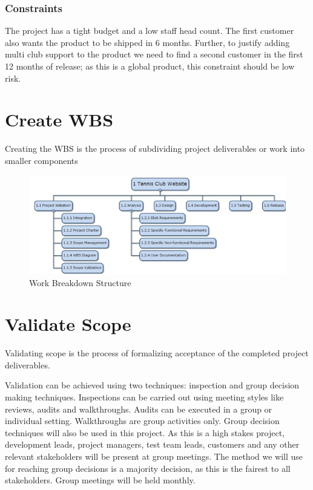 \subsubsection{Constraints}

The project has a tight budget and a low staff head count. The first customer also wants the product to be shipped in 6 months. Further, to justify adding multi club support to the product we need to find a second customer in the first 12 months of release; as this is a global product, this constraint should be low risk.

\section{Create WBS}

Creating the WBS is the process of subdividing project deliverables or work into smaller components

\begin{figure} [H]
\begin{center}
\includegraphics[scale=0.9]{wbs.png}
\caption{Work Breakdown Structure}
\label{fig:in1}
\end{center}
\end{figure}

\section{Validate Scope}

Validating scope is the process of formalizing acceptance of the completed project deliverables.

Validation can be achieved using two techniques: inspection and group decision making techniques. Inspections can be carried out using meeting styles like reviews, audits and walkthroughs. Audits can be executed in a group or individual setting. Walkthroughs are group activities only. Group decision techniques will also be used in this project. As this is a high stakes project, development leads, project managers, test team leads, customers and any other relevant stakeholders will be present at group meetings. The method we will use for reaching group decisions is a majority decision, as this is the fairest to all stakeholders. Group meetings will be held monthly.

